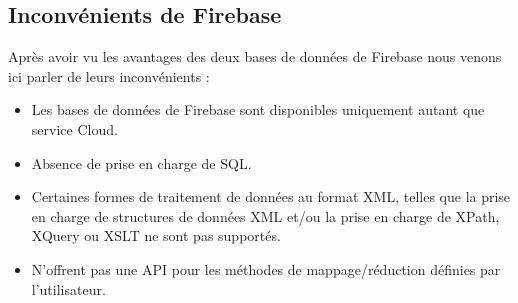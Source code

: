 \subsection{Inconvénients de Firebase}
Après avoir vu les avantages des deux bases de données de Firebase nous venons ici parler de leurs inconvénients :

\begin{itemize}
\item Les bases de données de Firebase sont disponibles uniquement autant que service Cloud.
\item Absence de prise en charge de SQL.
\item Certaines formes de traitement de données au format XML, telles que la prise en charge de structures de données XML et/ou la prise en charge de XPath, XQuery ou XSLT ne sont pas supportés.
\item N'offrent pas une API pour les méthodes de mappage/réduction définies par l'utilisateur.
\end{itemize}